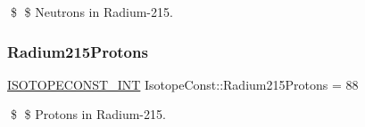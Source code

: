 \$ \$ Neutrons in Radium-\/215. \mbox{\label{group___isotope_const-_radium-_ra215_gae1d383b7addb2be1192161dcf87b58ea}} 
\subsubsection{\texorpdfstring{Radium215\+Protons}{Radium215Protons}}
{\footnotesize\ttfamily \mbox{\hyperlink{group___isotope_const-_macros_ga5f18360b3e99483a35c32d789e62621c}{I\+S\+O\+T\+O\+P\+E\+C\+O\+N\+S\+T\+\_\+\+I\+NT}} Isotope\+Const\+::\+Radium215\+Protons = 88}

\$ \$ Protons in Radium-\/215. 